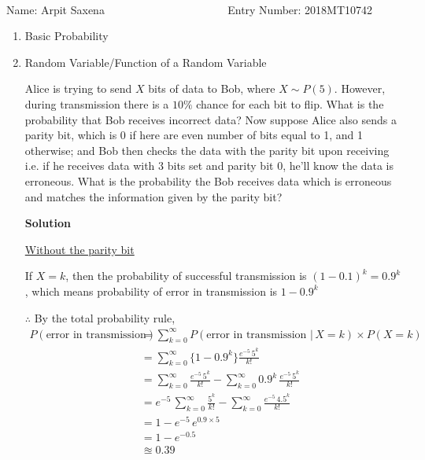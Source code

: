 \documentclass[12pt, oneside]{article}
\begin{document}
\setlength{\textheight}{8.5in}
\\





\vskip 0.5cm

\noindent Name: Arpit Saxena ~~~~~~~~~~~~~~~~~~~~~ Entry Number: 2018MT10742



\vskip 0.5cm



\begin{enumerate}
	



\item {
    Basic Probability
}


\item {
    Random Variable/Function of a Random Variable

    Alice is trying to send \(X\) bits of data to Bob, where \(X \sim P(5)\). However, during
    transmission there is a \(10\%\) chance for each bit to flip. What is the probability
    that Bob receives incorrect data? Now suppose Alice also sends a parity bit, which is
    0 if here are even number of bits equal to 1, and 1 otherwise; and Bob then checks the
    data with the parity bit upon receiving i.e. if he receives data with 3 bits set and
    parity bit 0, he'll know the data is erroneous. What is the probability the Bob receives
    data which is erroneous and matches the information given by the parity bit?

    \textbf{Solution}

    \underline{Without the parity bit}

    If \(X = k\), then the probability of successful transmission is \((1 - 0.1)^k = 0.9 ^ k\),
    which means probability of error in transmission is \(1 - 0.9^k\)

    \(\therefore\) By the total probability rule,
    \begin{align*}
        P(\text{error in transmission}) &= \sum_{k = 0}^{\infty} 
                        P(\text{error in transmission } |\,X = k) \times P(X = k) \\
            &= \sum_{k = 0}^{\infty} \{1 - 0.9^k\} \frac{e^{-5}\,5^k}{k!} \\
            &= \sum_{k = 0}^{\infty} \frac{e^{-5}\,5^k}{k!} - \sum_{k = 0}^{\infty} 0.9^k\,\frac{e^{-5}\,5^k}{k!} \\
            &= e^{-5}\,\sum_{k = 0}^{\infty} \frac{5^k}{k!} - \sum_{k = 0}^{\infty} \frac{e^{-5}\,4.5^k}{k!} \\
            &= 1 - e^{-5}\,e^{0.9 \times 5}  \tag*{(Using Taylor series of \(e^x\))} \\
            &= 1 - e^{-0.5} \\
            &\approxeq 0.39
    \end{align*}

}
\end{enumerate}
\end{document}
